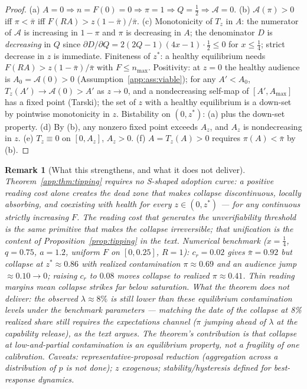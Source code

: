 \documentclass[12pt]{article}
\newtheorem{remark}{Remark}
\begin{document}
\begin{proof}
(a) $A=0\Rightarrow n=F(0)=0\Rightarrow\pi=1\Rightarrow Q=\tfrac12\Rightarrow
\mathcal{A}=0$. (b) $\mathcal{A}(\pi)>0$ iff $\pi<\bar\pi$ iff
$F(RA)>z(1-\bar\pi)/\bar\pi$. (c) Monotonicity of $T_z$ in $A$: the numerator of
$\mathcal{A}$ is increasing in $1-\pi$ and $\pi$ is decreasing in $A$; the
denominator $D$ is \emph{decreasing} in $Q$ since
$\partial D/\partial Q=2(2Q-1)(4x-1)\cdot\tfrac12\le0$ for $x\le\tfrac14$;
strict decrease in $z$ is immediate. Finiteness of $z^*$: a healthy equilibrium
needs $F(RA)>z(1-\bar\pi)/\bar\pi$ with $F\le n_{\max}$. Positivity: at $z=0$
the healthy audience is $A_0=\mathcal{A}(0)>0$ (Assumption~\ref{app:ass:viable});
for any $A'<A_0$, $T_z(A')\to\mathcal{A}(0)>A'$ as $z\to0$, and a nondecreasing
self-map of $[A',A_{\max}]$ has a fixed point (Tarski); the set of $z$ with a
healthy equilibrium is a down-set by pointwise monotonicity in $z$.
Bistability on $(0,z^*)$: (a) plus the down-set property. (d) By (b), any
nonzero fixed point exceeds $A_z$, and $A_z$ is nondecreasing in $z$.
(e) $T_z\equiv0$ on $[0,A_z]$, $A_z>0$. (f) $A=T_z(A)>0$ requires
$\pi(A)<\bar\pi$ by (b).
\end{proof}

\begin{remark}[What this strengthens, and what it does not deliver]
Theorem~\ref{app:thm:tipping} requires no S-shaped adoption curve: a positive
reading cost alone creates the dead zone that makes collapse discontinuous,
locally absorbing, and coexisting with health for every $z\in(0,z^*)$ --- for
\emph{any} continuous strictly increasing $F$. The reading cost that generates
the unverifiability threshold is the same primitive that makes the collapse
irreversible; that unification is the content of Proposition~\ref{prop:tipping} in the text. Numerical benchmark ($x=\tfrac14$,
$q=0.75$, $a=1.2$, uniform $F$ on $[0,0.25]$, $R=1$): $c_r=0.02$ gives
$\bar\pi=0.92$ but collapse at $z^*\approx0.86$ with realized contamination
$\pi\approx0.69$ and an audience jump $\approx0.10\to0$; raising $c_r$ to
$0.08$ moves collapse to realized $\pi\approx0.41$. Thin reading margins mean
collapse strikes far below saturation. What the theorem does \emph{not} deliver:
the observed $\lambda\approx8\%$ is still lower than these equilibrium
contamination levels under the benchmark parameters --- matching the \emph{date}
of the collapse at 8\% realized share still requires the expectations channel
($\pi$ jumping ahead of $\lambda$ at the capability release), as the text argues. The theorem's contribution is that collapse at
low-and-partial contamination is an equilibrium property, not a fragility of
one calibration. Caveats: representative-proposal reduction (aggregation across
a distribution of $p$ is not done); $z$ exogenous; stability/hysteresis defined
for best-response dynamics.
\end{remark}
\end{document}
